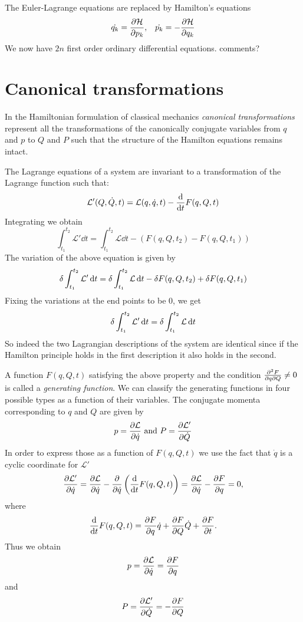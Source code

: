 \documentclass[../thesis.tex]{subfiles}
\theoremstyle{plain}
\begin{document}
The Euler-Lagrange equations are replaced by Hamilton's equations
\begin{align*}
  \dot{q_k} = \pdv{\mathcal{H}}{p_k}, &&
  \dot{p_k} = -\pdv{\mathcal{H}}{q_k}
\end{align*}
We now have \(2n\) first order ordinary differential equations. {\color{red}comments?}

\section{Canonical transformations}

In the Hamiltonian formulation of classical mechanics \emph{canonical transformations}
represent all the transformations of the canonically conjugate variables from
$q$ and $p$ to $Q$ and $P$ such that the structure of the Hamilton equations remains intact.

The Lagrange equations of a system are invariant to a transformation of the
Lagrange function such that:
\[
  \mathcal{L'}(Q, \dot{Q}, t) = \mathcal{L}(q, \dot{q}, t) - \dv{t}F(q, Q, t)
\]
Integrating we obtain
\[
  \int_{t_1}^{t_2} \mathcal{L'} \dd{t} = \int_{t_1}^{t_2} \mathcal{L} \dd{t}
  - \left( F(q, Q, t_2) - F(q, Q, t_1) \right)
\]
The variation of the above equation is given by
\[
  \var{\int_{t_1}^{t_2} \mathcal{L'} \dd{t}} = \var{\int_{t_1}^{t_2} \mathcal{L} \dd{t}}
  - \var{F(q, Q, t_2)} + \var{F(q, Q, t_1)}
\]
Fixing the variations at the end points to be $0$, we get
\[
  \var{\int_{t_1}^{t_2} \mathcal{L'} \dd{t}} = \var{\int_{t_1}^{t_2} \mathcal{L} \dd{t}}
\]
So indeed the two Lagrangian descriptions of the system are identical since if the
\mbox{Hamilton} principle holds in the first description it also holds in the second.

A function \(F(q, Q, t)\) satisfying the above property and the condition
\(\pdv{F}{q}{Q} \neq 0\) is called a \emph{generating function}.
We can classify the generating functions in four possible types
as a function of their variables.
The conjugate momenta corresponding to $q$ and $Q$ are given by
\[
  p = \pdv{\mathcal{L}}{\dot{q}} \text{ and } P = \pdv{\mathcal{L'}}{\dot{Q}}
\]
In order to express those as a function of \(F(q, Q, t)\) we use the fact
that \(\dot{q}\) is a cyclic coordinate for \(\mathcal{L'}\)
\[
  \pdv{\mathcal{L'}}{\dot{q}} = \pdv{\mathcal{L}}{\dot{q}} -
  \pdv{\dot{q}} \left( \dv{t}F(q, Q, t) \right) =
  \pdv{\mathcal{L}}{\dot{q}} - \pdv{F}{q} = 0,
\]
where
\[
  \dv{t}F(q, Q, t) = \pdv{F}{q} \dot{q} + \pdv{F}{Q} \dot{Q} + \pdv{F}{t}.
\]
Thus we obtain
\[
  p = \pdv{\mathcal{L}}{\dot{q}} = \pdv{F}{q}
\]
and
\[
  P = \pdv{\mathcal{L'}}{\dot{Q}} = - \pdv{F}{Q}
\]
\end{document}
